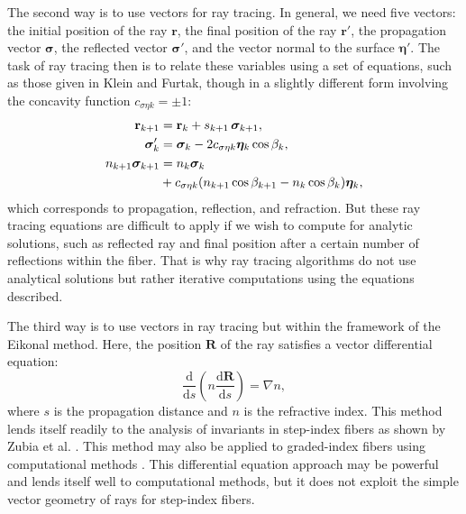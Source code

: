 \documentclass[a4paper,twocolumn,superscriptaddress]{revtex4-1}
\begin{document}
The second way is to use vectors for ray tracing. 
In general, we need five vectors: the initial position of the ray $\mathbf r$, the final position of the ray $\mathbf r'$, the propagation vector $\bm \sigma$, the reflected vector $\bm \sigma'$, and the vector normal to the surface $\bm \eta'$. 
The task of ray tracing then is to relate these variables using a set of equations, such as those given in Klein and Furtak\cite{kleitak}, though in a slightly different form involving the concavity function $c_{\sigma \eta k} = \pm 1$:
\begin{subequations}
\label{eq:kleitakraytracing}
\begin{align}
  \mathbf r_{k+1} &= 
  \mathbf r_k + s_{k+1} \, \bm \sigma_{k+1} ,
\\
\label{eq:kleitakreflection}
\bm \sigma_k' &= \bm \sigma_k - 2c_{\sigma \eta k} \bm \eta_k \cos \beta_k ,
\\
n_{k+1} \bm \sigma_{k+1} &= n_k \bm \sigma_k \notag
\\ &
\label{eq:kleitakrefraction}
+ c_{\sigma \eta k}(n_{k+1} \cos \beta_{k+1} - n_k \cos \beta_k)\bm \eta_k ,
\end{align}
\end{subequations}
which corresponds to propagation, reflection, and refraction. 
But these ray tracing equations are difficult to apply if we wish to compute for analytic solutions, such as reflected ray and final position after a certain number of reflections within the fiber. That is why ray tracing algorithms do not use analytical solutions but rather iterative computations using the equations described\cite{Witkowski, kovac2}. 





The third way is to use vectors in ray tracing but within the framework of the Eikonal method.
\cite{gbur,bornwolf}
Here, the position $\mathbf R$ of the ray satisfies a vector differential equation:
\begin{equation}
\frac{\mathrm{d}}{\mathrm{d}s}\left(n\frac{\mathrm{d}\mathbf{R}}{\mathrm{d}s}\right) = \nabla n ,
\end{equation}
where $s$ is the propagation distance and $n$ is the refractive index. This method lends itself readily to the analysis of invariants in step-index fibers as shown by Zubia et al. \cite{zubia}. This method may also be applied to graded-index fibers using computational methods%
\cite{Witkowski,Sakamoto,Southwell}. 
This differential equation approach may be powerful and lends itself well to computational methods, but it does not exploit the simple vector geometry of rays for step-index fibers. 
\end{document}
